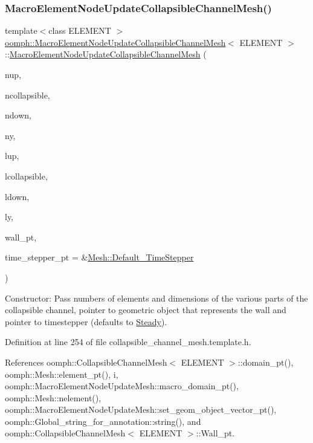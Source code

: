 \subsubsection{\texorpdfstring{Macro\+Element\+Node\+Update\+Collapsible\+Channel\+Mesh()}{MacroElementNodeUpdateCollapsibleChannelMesh()}}
{\footnotesize\ttfamily template$<$class E\+L\+E\+M\+E\+NT $>$ \\
\hyperlink{classoomph_1_1MacroElementNodeUpdateCollapsibleChannelMesh}{oomph\+::\+Macro\+Element\+Node\+Update\+Collapsible\+Channel\+Mesh}$<$ E\+L\+E\+M\+E\+NT $>$\+::\hyperlink{classoomph_1_1MacroElementNodeUpdateCollapsibleChannelMesh}{Macro\+Element\+Node\+Update\+Collapsible\+Channel\+Mesh} (\begin{DoxyParamCaption}\item[{const unsigned \&}]{nup,  }\item[{const unsigned \&}]{ncollapsible,  }\item[{const unsigned \&}]{ndown,  }\item[{const unsigned \&}]{ny,  }\item[{const double \&}]{lup,  }\item[{const double \&}]{lcollapsible,  }\item[{const double \&}]{ldown,  }\item[{const double \&}]{ly,  }\item[{\hyperlink{classoomph_1_1GeomObject}{Geom\+Object} $\ast$}]{wall\+\_\+pt,  }\item[{\hyperlink{classoomph_1_1TimeStepper}{Time\+Stepper} $\ast$}]{time\+\_\+stepper\+\_\+pt = {\ttfamily \&\hyperlink{classoomph_1_1Mesh_a12243d0fee2b1fcee729ee5a4777ea10}{Mesh\+::\+Default\+\_\+\+Time\+Stepper}} }\end{DoxyParamCaption})\hspace{0.3cm}{\ttfamily [inline]}}



Constructor\+: Pass numbers of elements and dimensions of the various parts of the collapsible channel, pointer to geometric object that represents the wall and pointer to timestepper (defaults to \hyperlink{classoomph_1_1Steady}{Steady}). 



Definition at line 254 of file collapsible\+\_\+channel\+\_\+mesh.\+template.\+h.



References oomph\+::\+Collapsible\+Channel\+Mesh$<$ E\+L\+E\+M\+E\+N\+T $>$\+::domain\+\_\+pt(), oomph\+::\+Mesh\+::element\+\_\+pt(), i, oomph\+::\+Macro\+Element\+Node\+Update\+Mesh\+::macro\+\_\+domain\+\_\+pt(), oomph\+::\+Mesh\+::nelement(), oomph\+::\+Macro\+Element\+Node\+Update\+Mesh\+::set\+\_\+geom\+\_\+object\+\_\+vector\+\_\+pt(), oomph\+::\+Global\+\_\+string\+\_\+for\+\_\+annotation\+::string(), and oomph\+::\+Collapsible\+Channel\+Mesh$<$ E\+L\+E\+M\+E\+N\+T $>$\+::\+Wall\+\_\+pt.

